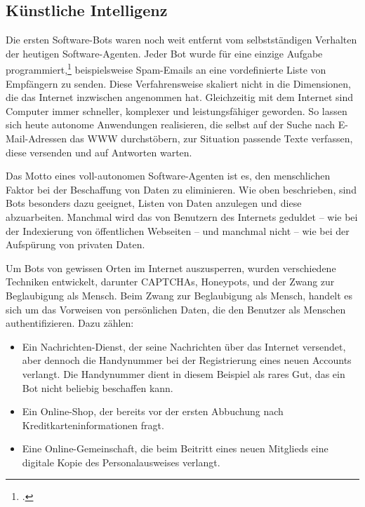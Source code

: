 \subsection{Künstliche Intelligenz}
\label{sub:kunstliche_intelligenz}

Die ersten Software-Bots waren noch weit entfernt vom selbstständigen Verhalten
der heutigen Software-Agenten. Jeder Bot wurde für eine einzige Aufgabe
programmiert,\footcite{wa:spamFilter} beispielsweise Spam-Emails an eine
vordefinierte Liste von Empfängern zu senden. Diese Verfahrensweise skaliert
nicht in die Dimensionen, die das Internet inzwischen angenommen hat.
Gleichzeitig mit dem Internet sind Computer immer schneller, komplexer und
leistungsfähiger geworden. So lassen sich heute autonome Anwendungen
realisieren, die selbst auf der Suche nach E-Mail-Adressen das WWW
durchstöbern, zur Situation passende Texte verfassen, diese versenden und auf
Antworten warten.

Das Motto eines voll-autonomen Software-Agenten ist es, den menschlichen Faktor
bei der Beschaffung von Daten zu eliminieren. Wie oben beschrieben, sind Bots
besonders dazu geeignet, Listen von Daten anzulegen und diese abzuarbeiten.
Manchmal wird das von Benutzern des Internets geduldet -- wie bei der
Indexierung von öffentlichen Webseiten -- und manchmal nicht -- wie bei der
Aufspürung von privaten Daten.

Um Bots von gewissen Orten im Internet auszusperren, wurden verschiedene
Techniken entwickelt, darunter CAPTCHAs,
Honeypots, und der Zwang zur Beglaubigung als Mensch.
Beim Zwang zur Beglaubigung als Mensch, handelt es sich um das Vorweisen von
persönlichen Daten, die den Benutzer als Menschen authentifizieren. Dazu zählen:

\begin{itemize}
\item
  Ein Nachrichten-Dienst, der seine Nachrichten über das Internet versendet,
  aber dennoch die Handynummer bei der Registrierung eines neuen Accounts
  verlangt. Die Handynummer dient in diesem Beispiel als rares Gut, das ein Bot
  nicht beliebig beschaffen kann.
\item
  Ein Online-Shop, der bereits vor der ersten Abbuchung nach
  Kreditkarteninformationen fragt.
\item
  Eine Online-Gemeinschaft, die beim Beitritt eines neuen Mitglieds eine
  digitale Kopie des Personalausweises verlangt.
\end{itemize}

